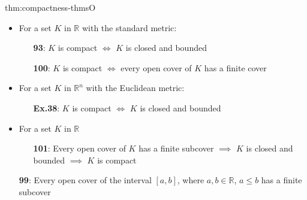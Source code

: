 \documentclass[landscape, 8pt]{extarticle}
\begin{document}
\begin{multicols}{3}
\vspace{-6pt}
\begin{thm}{thm:compactness-thms}{O}
    \vspace{-5pt}
    \vspace{-7pt}
    \begin{itemize}[leftmargin=1.5em]
        \item For a set $K$ in $\mathbb{R}$ with the standard metric:
            \vspace{-5pt}
            \begin{itemize}
                \item[\textbf{93}:] $K$ is compact $\iff$ $K$ is closed and bounded
                \item[\textbf{100}:] $K$ is compact $\iff$ every open cover of $K$ has a finite cover
            \end{itemize}


        \vspace{-5pt}
        \item For a set $K$ in $\mathbb{R}^{n}$ with the Euclidean metric:
            \vspace{-5pt}
            \begin{itemize}
                \item[\textbf{Ex.38}:] $K$ is compact $\iff$ $K$ is closed and bounded
            \end{itemize}

        \vspace{-5pt}
        \item For a set $K$ in $\mathbb{R}$
            \vspace{-5pt}
            \begin{itemize}
                \item[\textbf{101}:] Every open cover of $K$ has a finite subcover $\implies$ $K$ is closed and bounded $\implies$ $K$ is compact
            \end{itemize} 

        \vspace{-5pt}
    \item[\textbf{99}:] Every open cover of the interval $[a, b]$, where $a, b\in \mathbb{R}$, $a \le b$ has a finite subcover

    
    \end{itemize}


\end{thm}
\end{multicols}
\end{document}
